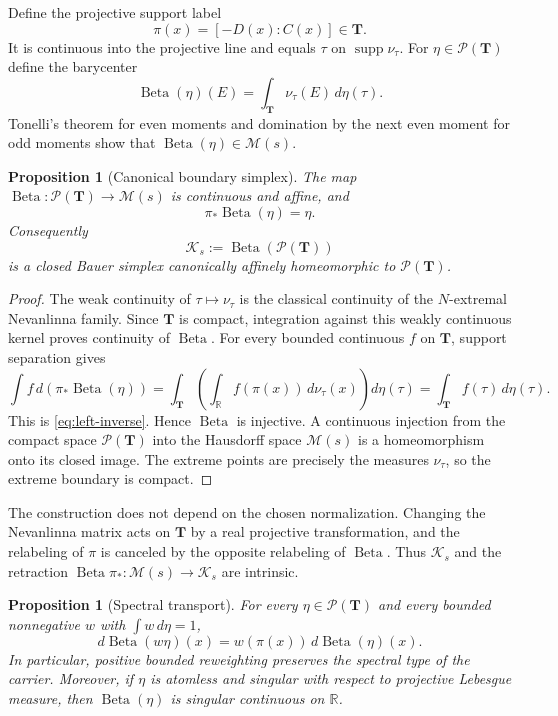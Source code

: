 \documentclass[11pt]{article}
\newtheorem{proposition}[theorem]{Proposition}
\newcommand{\R}{\mathbb R}
\newcommand{\cK}{\mathcal K}
\newcommand{\cM}{\mathcal M}
\newcommand{\cP}{\mathcal P}
\newcommand{\supp}{\operatorname{supp}}
\newcommand{\Beta}{\operatorname{Beta}}
\begin{document}
Define the projective support label
\begin{equation}\label{eq:pi}
  \pi(x)=[-D(x):C(x)]\in\mathbf T.
\end{equation}
It is continuous into the projective line and equals $\tau$ on
$\supp\nu_\tau$.  For $\eta\in\cP(\mathbf T)$ define the barycenter
\begin{equation}\label{eq:beta}
  \Beta(\eta)(E)=\int_{\mathbf T}\nu_\tau(E)\,d\eta(\tau).
\end{equation}
Tonelli's theorem for even moments and domination by the next even moment for odd moments show
that $\Beta(\eta)\in\cM(s)$.

\begin{proposition}[Canonical boundary simplex]\label{prop:beta}
The map $\Beta:\cP(\mathbf T)\to\cM(s)$ is continuous and affine, and
\begin{equation}\label{eq:left-inverse}
  \pi_*\Beta(\eta)=\eta.
\end{equation}
Consequently
\[
  \cK_s:=\Beta(\cP(\mathbf T))
\]
is a closed Bauer simplex canonically affinely homeomorphic to
$\cP(\mathbf T)$.
\end{proposition}

\begin{proof}
The weak continuity of $\tau\mapsto\nu_\tau$ is the classical continuity of the
$N$-extremal Nevanlinna family.  Since $\mathbf T$ is compact, integration against this weakly
continuous kernel proves continuity of $\Beta$.  For every bounded continuous $f$ on
$\mathbf T$, support separation gives
\[
 \int f\,d(\pi_*\Beta(\eta))
 =\int_{\mathbf T}\left(\int_{\R}f(\pi(x))\,d\nu_\tau(x)\right)d\eta(\tau)
 =\int_{\mathbf T}f(\tau)\,d\eta(\tau).
\]
This is \eqref{eq:left-inverse}.  Hence $\Beta$ is injective.  A continuous injection from the
compact space $\cP(\mathbf T)$ into the Hausdorff space $\cM(s)$ is a homeomorphism onto its
closed image.  The extreme points are precisely the measures $\nu_\tau$, so the extreme boundary
is compact.
\end{proof}

The construction does not depend on the chosen normalization.  Changing the Nevanlinna matrix
acts on $\mathbf T$ by a real projective transformation, and the relabeling of $\pi$ is canceled by
the opposite relabeling of $\Beta$.  Thus $\cK_s$ and the retraction
$\Beta\pi_*:\cM(s)\to\cK_s$ are intrinsic.

\begin{proposition}[Spectral transport]\label{prop:spectral-transport}
For every $\eta\in\cP(\mathbf T)$ and every bounded nonnegative $w$ with
$\int w\,d\eta=1$,
\begin{equation}\label{eq:density-transport}
  d\Beta(w\eta)(x)=w(\pi(x))\,d\Beta(\eta)(x).
\end{equation}
In particular, positive bounded reweighting preserves the spectral type of the carrier.  Moreover,
if $\eta$ is atomless and singular with respect to projective Lebesgue measure, then
$\Beta(\eta)$ is singular continuous on $\R$.
\end{proposition}
\end{document}

